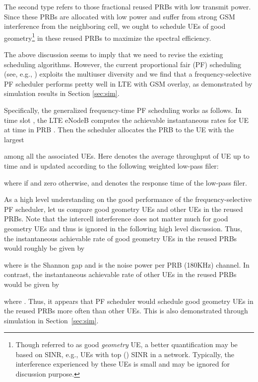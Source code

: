\documentclass[10pt,journal]{IEEEtran}
\theoremstyle{slplain}
\begin{document}
The second type refers to those fractional reused PRBs with low transmit power. Since these PRBs are allocated with low power and suffer from strong GSM interference from the neighboring cell, we ought to schedule UEs of good geometry\footnote{Though referred to as good \textit{geometry} UE, a better quantification may be based on SINR, e.g., UEs with top  () SINR in a network. Typically, the interference experienced  by these UEs is small and may be ignored for discussion purpose.} in these reused PRBs to maximize the spectral efficiency.


The above discussion seems to imply that we need to revise the existing scheduling algorithms. However, the current proportional fair (PF)  scheduling (see, e.g., \cite{Tse2005Fundamentals, Kushner2004Convergence, Stolyar2005on}) exploits the multiuser diversity and we find that a frequency-selective PF scheduler performs pretty well in LTE with GSM overlay, as demonstrated by simulation results in Section \ref{sec:sim}. 

Specifically, the generalized frequency-time PF scheduling works as follows. In time slot , the LTE eNodeB computes the achievable instantaneous rates  for UE  at time  in PRB . Then the scheduler allocates the PRB  to the UE  with the largest

among all the associated UEs. Here  denotes the average throughput of UE  up to time  and is updated according to the following weighted low-pass filer:

where  if  and zero otherwise, and  denotes the response time of the low-pass filer.





As a high level understanding on the good performance of the frequency-selective PF scheduler, let us compare good geometry UEs and other UEs in the reused PRBs. Note that the intercell interference does not matter much for good geometry UEs and thus is ignored in the following high level discussion. Thus, the instantaneous achievable rate of good geometry UEs in the reused PRBs would roughly be given by

where  is the Shannon gap and  is the noise power per PRB (180KHz) channel. In contrast, the instantaneous achievable rate of other UEs in the reused PRBs would be given by

where . Thus, it appears that PF scheduler would schedule good geometry UEs in the reused PRBs more often than other UEs. This is also demonstrated through simulation in Section~\ref{sec:sim}.
\end{document}
